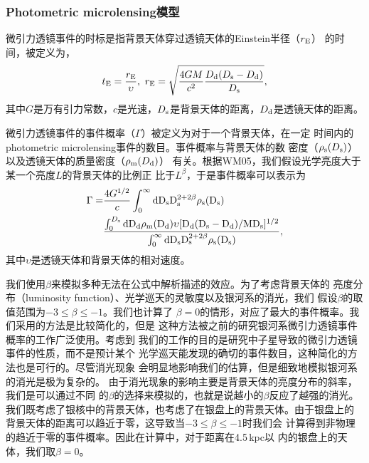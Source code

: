 \subsubsection{Photometric microlensing模型}

微引力透镜事件的时标是指背景天体穿过透镜天体的Einstein半径（$r_{\rm{E}}$）
的时间，被定义为\supercite{Paczynski1996}，
%
\begin{equation}
\label{te}
t_{\rm{E}}=\frac{r_{\rm{E}}}{\upsilon},\
r_{\rm{E}}=\sqrt{\frac{4GM}{c^{2}}\frac{D_{\rm{d}}(D_{\rm{s}}-D_{\rm{d}})}{D_{\rm{s}}}},
\end{equation}
%
其中$G$是万有引力常数，$c$是光速，$D_{\rm{s}}$是背景天体的距离，$D_{\rm{d}}$是透镜天体的距离。

微引力透镜事件的事件概率（$\Gamma$）被定义为对于一个背景天体，在一定
时间内的photometric microlensing事件的数目。事件概率与背景天体的数
密度（$\rho_{\rm{s}}(D_{\rm{s}})$）以及透镜天体的质量密度（$\rho_{\rm{m}}(D_{\rm{d}})$）
有关。根据WM05，我们假设光学亮度大于某一个亮度$L$的背景天体的比例正
比于$L^{\beta}$，于是事件概率可以表示为
%
\begin{equation}
\label{rate}
\begin{split}
\Gamma=&\frac{4G^{1/2}}{c}\int_{0}^{\infty}\rm{d}D_{\rm{s}}D_{\rm{s}}^{2+2\beta}\rho_{\rm{s}}(D_{\rm{s}})\\
	     &\frac{\int_{0}^{D_{\rm{s}}}\rm{d}D_{\rm{d}}\rho_{\rm{m}}(D_{\rm{d}})\upsilon[D_{\rm{d}}(D_{\rm{s}}-D_{\rm{d}})/MD_{\rm{s}}]^{1/2}}{\int_{0}^{\infty}\rm{d}D_{\rm{s}}D_{\rm{s}}^{2+2\beta}\rho_{\rm{s}}(D_{\rm{s}})},
\end{split}
\end{equation}
%
其中$\upsilon$是透镜天体和背景天体的相对速度。

我们使用$\beta$来模拟多种无法在公式中解析描述的效应。为了考虑背景天体的
亮度分布（luminosity function）、光学巡天的灵敏度以及银河系的消光，我们
假设$\beta$的取值范围为$-3\leq\beta\leq-1$\supercite{kiraga}。我们也计算了
$\beta=0$的情形，对应了最大的事件概率。我们采用的方法是比较简化的，但是
这种方法被之前的研究银河系微引力透镜事件概率的工作广泛使用。考虑到
我们的工作的目的是研究中子星导致的微引力透镜事件的性质，而不是预计某个
光学巡天能发现的确切的事件数目，这种简化的方法也是可行的。尽管消光现象
会明显地影响我们的估算，但是细致地模拟银河系的消光是极为复杂的\supercite{kerins}。
由于消光现象的影响主要是背景天体的亮度分布的斜率，我们是可以通过不同
的$\beta$的选择来模拟的，也就是说越小的$\beta$反应了越强的消光。
我们既考虑了银核中的背景天体，也考虑了在银盘上的背景天体。由于银盘上的
背景天体的距离可以趋近于零，这导致当$-3\leq\beta\leq-1$时我们会
计算得到非物理的趋近于零的事件概率。因此在计算中，对于距离在4.5\,kpc以
内的银盘上的天体，我们取$\beta=0$。

